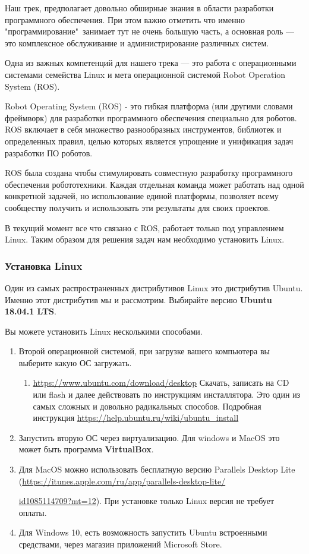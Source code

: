 Наш трек, предполагает довольно обширные знания в области разработки программного обеспечения. При этом важно отметить что именно "программирование"\ занимает тут не очень большую часть, а основная роль — это комплексное обслуживание и администрирование различных систем.

Одна из важных компетенций для нашего трека — это работа с операционными системами семейства Linux и мета операционной системой Robot Operation System (ROS).

Robot Operating System (ROS) - это гибкая платформа (или другими словами фреймворк) для разработки программного обеспечения специально для роботов. ROS включает в себя множество разнообразных инструментов, библиотек и определенных правил, целью которых является упрощение и унификация задач разработки ПО роботов.

ROS была создана чтобы стимулировать совместную разработку программного обеспечения робототехники. Каждая отдельная команда может работать над одной конкретной задачей, но использование единой платформы, позволяет всему сообществу получить и использовать эти результаты для своих проектов.

В текущий момент все что связано с ROS, работает только под управлением Linux. Таким образом для решения задач нам необходимо установить Linux.

\subsubsection*{Установка Linux}

Один из самых распространенных дистрибутивов Linux это дистрибутив Ubuntu. Именно этот дистрибутив мы и рассмотрим. Выбирайте версию \textbf{Ubuntu 18.04.1 LTS}.

Вы можете установить Linux несколькими способами.
\begin{enumerate}
    \item Второй операционной системой, при загрузке вашего компьютера вы выберите какую ОС загружать. 
    \begin{enumerate}
        \item \url{https://www.ubuntu.com/download/desktop} Скачать, записать на CD или flash и далее действовать по инструкциям инсталлятора. Это один из самых сложных и довольно радикальных способов. Подробная инструкция \url{https://help.ubuntu.ru/wiki/ubuntu_install}
    \end{enumerate}
    \item Запустить вторую ОС через виртуализацию. Для windows и MacOS это может быть программа \textbf{VirtualBox}.
    \item Для MacOS можно использовать бесплатную версию Parallels Desktop Lite (\url{https://itunes.apple.com/ru/app/parallels-desktop-lite/}
    
    \url{id1085114709?mt=12}). При установке только Linux версия не требует оплаты.
    \item Для Windows 10, есть возможность запустить Ubuntu встроенными средствами, через магазин приложений Microsoft Store.
\end{enumerate}

